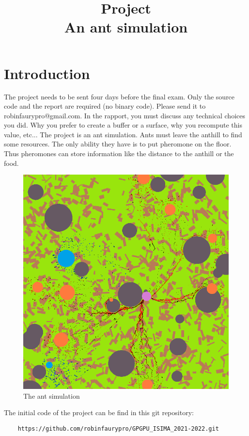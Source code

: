\documentclass{article}
\begin{document}
\title{Project\\An ant simulation}
\maketitle

\section{Introduction}
The project needs to be sent four days before the final exam. Only the source code and the report are required (no binary code). Please send it to robinfaurypro@gmail.com. In the rapport, you must discuss any technical choices you did. Why you prefer to create a buffer or a surface, why you recompute this value, etc...
The project is an ant simulation. Ants must leave the anthill to find some resources. The only ability they have is to put pheromone on the floor. Thus pheromones can store information like the distance to the anthill or the food.
\begin{figure}[H]
	\centering
	\includegraphics[scale=0.74]{figures/project.png}
	\caption{The ant simulation}
\end{figure}

The initial code of the project can be find in this git repository:
\begin{lstlisting}
	https://github.com/robinfaurypro/GPGPU_ISIMA_2021-2022.git
\end{lstlisting}
\end{document}
